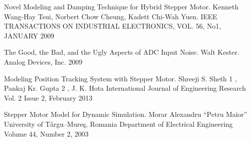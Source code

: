 \begin{thebibliography}{30}
        \foreignlanguage{english}{
                                                Novel Modeling and Damping Technique for Hybrid Stepper Motor.
                                                Kenneth Wang-Hay Tsui, Norbert Chow Cheung, Kadett Chi-Wah Yuen.
                                                IEEE TRANSACTIONS ON INDUSTRIAL ELECTRONICS, VOL. 56, No1, JANUARY 2009
                                            }

     \foreignlanguage{english}{
                                        The Good, the Bad, and the Ugly Aspects of ADC Input Noise.
                                        Walt Kester. Analog Devices, Inc. 2009
                                        }

     \foreignlanguage{english}{
                                                Modeling Position Tracking System with Stepper Motor.
                                                Shreeji S. Sheth 1 , Pankaj Kr. Gupta 2 , J. K. Hota
                                                International Journal of Engineering Research
                                                Vol. 2 Issue 2, February 2013
                                                }

     \foreignlanguage{english}{
                                                            Stepper Motor Model for Dynamic Simulation.
                                                            Morar Alexandru
                                                            ``Petru Maior'' University of Târgu–Mureş,
                                                            Romania Department of Electrical Engineering
                                                            Volume 44, Number 2, 2003
                                                        }
    
    
    
    

\end{thebibliography}
